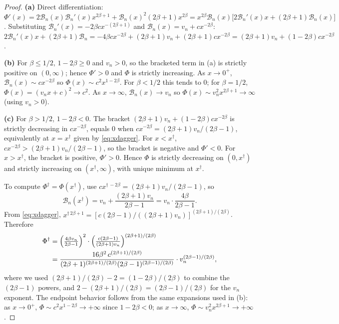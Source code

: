 \documentclass[11pt]{article}
\theoremstyle{plain}
\theoremstyle{definition}
\theoremstyle{remark}
\begin{document}
\begin{proof}
\textbf{(a)} Direct differentiation:
$\Phi'(x)=2\mathcal{B}_n(x)\mathcal{B}_n'(x)x^{2\beta+1}+\mathcal{B}_n(x)^2(2\beta+1)x^{2\beta}=x^{2\beta}\mathcal{B}_n(x)\bigl[2\mathcal{B}_n'(x)x+(2\beta+1)\mathcal{B}_n(x)\bigr]$.
Substituting $\mathcal{B}_n'(x)=-2\beta cx^{-(2\beta+1)}$ and $\mathcal{B}_n(x)=v_n+cx^{-2\beta}$:
$2\mathcal{B}_n'(x)x+(2\beta+1)\mathcal{B}_n=-4\beta cx^{-2\beta}+(2\beta+1)v_n+(2\beta+1)cx^{-2\beta}=(2\beta+1)v_n+(1-2\beta)cx^{-2\beta}$.

\textbf{(b)} For $\beta\le 1/2$, $1-2\beta\ge0$ and $v_n>0$, so the bracketed term in (a) is strictly positive on $(0,\infty)$; hence $\Phi'>0$ and $\Phi$ is strictly increasing. As $x\to0^+$, $\mathcal{B}_n(x)\sim cx^{-2\beta}$ so $\Phi(x)\sim c^2 x^{1-2\beta}$. For $\beta<1/2$ this tends to $0$; for $\beta=1/2$, $\Phi(x)=(v_nx+c)^2\to c^2$. As $x\to\infty$, $\mathcal{B}_n(x)\to v_n$ so $\Phi(x)\sim v_n^2 x^{2\beta+1}\to\infty$ (using $v_n>0$).

\textbf{(c)} For $\beta>1/2$, $1-2\beta<0$. The bracket $(2\beta+1)v_n+(1-2\beta)cx^{-2\beta}$ is strictly decreasing in $cx^{-2\beta}$, equals $0$ when $cx^{-2\beta}=(2\beta+1)v_n/(2\beta-1)$, equivalently at $x=x^\dagger$ given by \cref{eq:xdagger}. For $x<x^\dagger$, $cx^{-2\beta}>(2\beta+1)v_n/(2\beta-1)$, so the bracket is negative and $\Phi'<0$. For $x>x^\dagger$, the bracket is positive, $\Phi'>0$. Hence $\Phi$ is strictly decreasing on $(0,x^\dagger)$ and strictly increasing on $(x^\dagger,\infty)$, with unique minimum at $x^\dagger$.

To compute $\Phi^\dagger=\Phi(x^\dagger)$, use $cx^{\dagger\,-2\beta}=(2\beta+1)v_n/(2\beta-1)$, so
\begin{equation*}
\mathcal{B}_n(x^\dagger)=v_n+\frac{(2\beta+1)v_n}{2\beta-1}=v_n\cdot\frac{4\beta}{2\beta-1}.
\end{equation*}
From \cref{eq:xdagger}, $x^{\dagger\,2\beta+1}=[c(2\beta-1)/((2\beta+1)v_n)]^{(2\beta+1)/(2\beta)}$. Therefore
\begin{align*}
\Phi^\dagger&=\Bigl(\tfrac{4\beta v_n}{2\beta-1}\Bigr)^2\cdot\Bigl(\tfrac{c(2\beta-1)}{(2\beta+1)v_n}\Bigr)^{(2\beta+1)/(2\beta)}\\
&=\frac{16\beta^2\,c^{(2\beta+1)/(2\beta)}}{(2\beta+1)^{(2\beta+1)/(2\beta)}(2\beta-1)^{(2\beta-1)/(2\beta)}}\cdot v_n^{(2\beta-1)/(2\beta)},
\end{align*}
where we used $(2\beta+1)/(2\beta)-2=(1-2\beta)/(2\beta)$ to combine the $(2\beta-1)$ powers, and $2-(2\beta+1)/(2\beta)=(2\beta-1)/(2\beta)$ for the $v_n$ exponent. The endpoint behavior follows from the same expansions used in (b): as $x\to0^+$, $\Phi\sim c^2x^{1-2\beta}\to+\infty$ since $1-2\beta<0$; as $x\to\infty$, $\Phi\sim v_n^2 x^{2\beta+1}\to+\infty$.
\end{proof}
\end{document}
